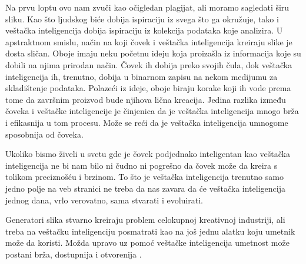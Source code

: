 \documentclass[12pt, letterpaper]{article}
\begin{document}
Na prvu loptu ovo nam zvuči kao očigledan plagijat, ali moramo sagledati širu sliku. Kao što ljudskog biće dobija ispiraciju iz svega što ga okružuje, tako i veštačka inteligencija dobija ispiraciju iz kolekcija podataka koje analizira. U apstraktnom smislu, način na koji čovek i veštačka inteligencija kreiraju slike je dosta sličan. Oboje imaju neku početnu ideju koja proizašla iz informacija koje su dobili na njima prirodan način. Čovek ih dobija preko svojih čula, dok veštačka inteligencija ih, trenutno, dobija u binarnom zapisu na nekom medijumu za skladištenje podataka. Polazeći iz ideje, oboje biraju korake koji ih vode prema tome da završnim proizvod bude njihova lična kreacija. Jedina razlika između čoveka i veštačke inteligencije je činjenica da je veštačka inteligencija mnogo brža i efikasnija u tom procesu. Može se reći da je veštačka inteligencija umnogome sposobnija od čoveka. 

Ukoliko bismo živeli u svetu gde je čovek podjednako inteligentan kao veštačka inteligencija ne bi nam bilo ni čudno ni pogrešno da čovek može da kreira s tolikom preciznošću i brzinom. To što je veštačka inteligencija trenutno samo jedno polje na veb stranici ne treba da nas zavara da će veštačka inteligencija jednog dana, vrlo verovatno, sama stvarati i evoluirati.

Generatori slika stvarno kreiraju problem celokupnoj kreativnoj industriji, ali treba na veštačku inteligenciju posmatrati kao na još jednu alatku koju umetnik može da koristi. Možda upravo uz pomoć veštačke inteligencija umetnost može postani brža, dostupnija i otvorenija \cite{fear}.
\end{document}
